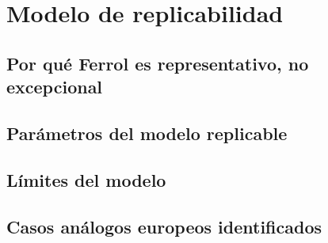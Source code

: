 \section{Modelo de replicabilidad}\label{sec:replicabilidad}

\subsection{Por qué Ferrol es representativo, no excepcional}\label{sec:ferrol-representativo}
\begin{pendiente}
\end{pendiente}

\subsection{Parámetros del modelo replicable}\label{sec:parametros-replicabilidad}
\begin{pendiente}
\end{pendiente}

\subsection{Límites del modelo}\label{sec:limites-modelo}
\begin{pendiente}
\end{pendiente}

\subsection{Casos análogos europeos identificados}\label{sec:casos-analogos}
\begin{pendiente}
\end{pendiente}
